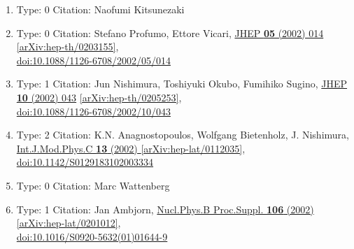 \documentclass[a4paper,10pt]{article}
\begin{document}
\begin{enumerate}
\begin{enumerate}
  \item Type: 0 Citation: Naofumi Kitsunezaki
  \item Type: 0 Citation: Stefano Profumo, Ettore Vicari, \href{https://www.doi.org/10.1088/1126-6708/2002/05/014}{JHEP {\bf 05} (2002) 014}  \href{https://arxiv.org/abs/hep-th/0203155}{[arXiv:hep-th/0203155]},\\\href{https://www.doi.org/10.1088/1126-6708/2002/05/014}{doi:10.1088/1126-6708/2002/05/014}
  \item Type: 1 Citation: Jun Nishimura, Toshiyuki Okubo, Fumihiko Sugino, \href{https://www.doi.org/10.1088/1126-6708/2002/10/043}{JHEP {\bf 10} (2002) 043}  \href{https://arxiv.org/abs/hep-th/0205253}{[arXiv:hep-th/0205253]},\\\href{https://www.doi.org/10.1088/1126-6708/2002/10/043}{doi:10.1088/1126-6708/2002/10/043}
  \item Type: 2 Citation: K.N. Anagnostopoulos, Wolfgang Bietenholz, J. Nishimura, \href{https://www.doi.org/10.1142/S0129183102003334}{Int.J.Mod.Phys.C {\bf 13} (2002) }  \href{https://arxiv.org/abs/hep-lat/0112035}{[arXiv:hep-lat/0112035]},\\\href{https://www.doi.org/10.1142/S0129183102003334}{doi:10.1142/S0129183102003334}
  \item Type: 0 Citation: Marc Wattenberg
  \item Type: 1 Citation: Jan Ambjorn, \href{https://www.doi.org/10.1016/S0920-5632(01)01644-9}{Nucl.Phys.B Proc.Suppl. {\bf 106} (2002) }  \href{https://arxiv.org/abs/hep-lat/0201012}{[arXiv:hep-lat/0201012]},\\\href{https://www.doi.org/10.1016/S0920-5632(01)01644-9}{doi:10.1016/S0920-5632(01)01644-9}

\end{enumerate}
\end{enumerate}
\end{document}
